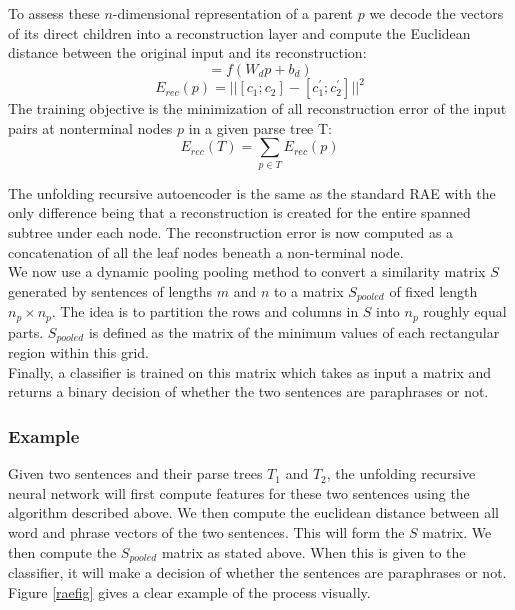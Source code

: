 \documentclass[conference]{IEEEtran}
\begin{document}
\indent To assess these $n$-dimensional representation of a parent $p$ we decode the vectors of its direct children into a reconstruction layer and compute the Euclidean distance between the original input and its reconstruction:
\begin{equation}
[c^\prime_1;c^\prime_2] = f(W_dp + b_d)
\end{equation}
\begin{equation}
E_{rec}(p) = ||[c_1;c_2] - [c^\prime_1;c^\prime_2]||^2
\end{equation}
The training objective is the minimization of all reconstruction error of the input pairs at nonterminal nodes $p$ in a given parse tree T:\\
\begin{equation}
E_{rec}(T) = \sum_{p \in T} E_{rec}(p)
\end{equation}

\indent The unfolding recursive autoencoder is the same as the standard RAE with the only difference being that a reconstruction is created for the entire spanned subtree under each node. The reconstruction error is now computed as a concatenation of all the leaf nodes beneath a non-terminal node.\\

\indent We now use a dynamic pooling pooling method to convert a similarity matrix $S$ generated by sentences of lengths $m$ and $n$ to a matrix $S_{pooled}$ of fixed length $n_p \times n_p$. The idea is to partition the rows and columns in $S$ into $n_p$ roughly equal parts. $S_{pooled}$ is defined as the matrix of the minimum values of each rectangular region within this grid.\\

\indent Finally, a classifier is trained on this matrix which takes as input a matrix and returns a binary decision of whether the two sentences are paraphrases or not.\\

\subsubsection{Example}
Given two sentences and their parse trees $T_1$ and $T_2$, the unfolding recursive neural network will first compute features for these two sentences using the algorithm described above. We then compute the euclidean distance between all word and phrase vectors of the two sentences. This will form the $S$ matrix. We then compute the $S_{pooled}$ matrix as stated above. When this is given to the classifier, it will make a decision of whether the sentences are paraphrases or not. Figure \ref{raefig} gives a clear example of the process visually.\\
\end{document}
